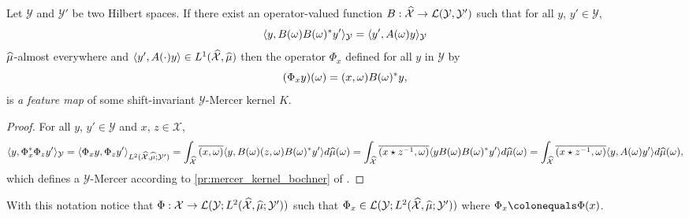 \begin{proposition}\label{pr:fourier_feature_map}
Let $\mathcal{Y}$ and $\mathcal{Y}'$ be two Hilbert spaces. If there exist an operator-valued function $B:\widehat{\mathcal{X}}\to\mathcal{L}(\mathcal{Y},\mathcal{Y}')$ such that for all $y$, $y'\in\mathcal{Y}$,
\begin{dmath*}
\inner{y, B(\omega)B(\omega)^\adjoint y'}_{\mathcal{Y}}=\inner{y', A(\omega)y}_{\mathcal{Y}}
\end{dmath*}
$\widehat{\mu}$-almost everywhere and $\langle y', A(\cdot)y\rangle\in L^1(\widehat{\mathcal{X}},\widehat{\mu})$ then the operator $\Phi_x$ defined for all $y$ in $\mathcal{Y}$ by
\begin{dmath}
\label{eq:feature_shiftinv_map}
(\Phi_x y)(\omega)=\pairing{x,\omega}B(\omega)^\adjoint y,
\end{dmath}
is \emph{a feature map} of some shift-invariant $\mathcal{Y}$-Mercer kernel $K$.
\end{proposition}
\begin{proof}
For all $y$, $y'\in \mathcal{Y}$ and $x$, $z\in\mathcal{X}$,
\begin{dmath*}
\inner{y, \Phi_x^\adjoint \Phi_z y'}_{\mathcal{Y}} = \inner{\Phi_x y, \Phi_z y'}_{L^2(\dual{\mathcal{X}},\dual{\mu};\mathcal{Y}')}  \\
= \int_{\dual{\mathcal{X}}}\conj{\pairing{x,\omega}}\inner{y, B(\omega)\pairing{z,\omega}B(\omega)^\adjoint y'}d\dual{\mu}(\omega) \\
= \int_{\dual{\mathcal{X}}}\conj{\pairing{x \groupop \myinv{z},\omega}}\inner{y B(\omega)B(\omega)^\adjoint y'}d\dual{\mu}(\omega) \\
= \int_{\dual{\mathcal{X}}}\conj{\pairing{x \groupop \inv{z},\omega}}\inner{y,A(\omega)y'}d\dual{\mu}(\omega),
\end{dmath*}
which defines a $\mathcal{Y}$-Mercer according to \cref{pr:mercer_kernel_bochner} of \citet{Carmeli2010}.
\end{proof}
With this notation notice that $\Phi: \mathcal{X} \to \mathcal{L}(\mathcal{Y}; L^2(\widehat{\mathcal{X}}, \widehat{\mu}; \mathcal{Y}'))$ such that $\Phi_x\in \mathcal{L}(\mathcal{Y}; L^2(\widehat{\mathcal{X}}, \widehat{\mu}; \mathcal{Y}'))$ where $\Phi_x\colonequals\Phi(x)$.

